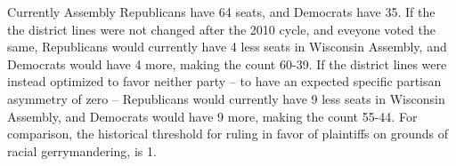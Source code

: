 \documentclass[preprint,12pt]{article}
\begin{document}
Currently Assembly Republicans have 64 seats, and Democrats have 35.
If the the district lines were not changed after the 2010 cycle, and eveyone voted the same, 
Republicans would currently have 4 less seats in Wisconsin Assembly, and Democrats would have 4 more, making the count 60-39.
If the district lines were instead optimized to favor neither party -- to have an expected specific partisan asymmetry of zero -- 
Republicans would currently have 9 less seats in Wisconsin Assembly, and Democrats would have 9 more, making the count 55-44.
For comparison, the historical threshold for ruling in favor of plaintiffs on grounds of racial gerrymandering, is 1.
\end{document}
